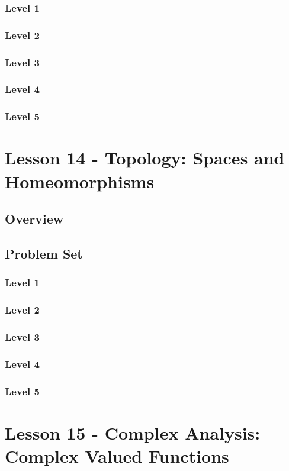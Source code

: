 \documentclass{article}
\begin{document}
\subsubsection{Level 1}
\subsubsection{Level 2}
\subsubsection{Level 3}
\subsubsection{Level 4}
\subsubsection{Level 5}
\pagebreak

\section{Lesson 14 - Topology: Spaces and Homeomorphisms}
\subsection{Overview}
\subsection{Problem Set}
\subsubsection{Level 1}
\subsubsection{Level 2}
\subsubsection{Level 3}
\subsubsection{Level 4}
\subsubsection{Level 5}
\pagebreak

\section{Lesson 15 - Complex Analysis: Complex Valued Functions}
\end{document}
